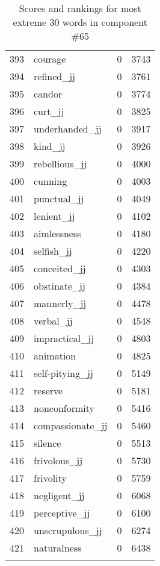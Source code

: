 \begin{longtable}[!htbp]{| rlr@{.}l |}
    393 & courage & 0 & 3743 \\
    394 & refined\_jj & 0 & 3761 \\
    395 & candor & 0 & 3774 \\
    396 & curt\_jj & 0 & 3825 \\
    397 & underhanded\_jj & 0 & 3917 \\
    398 & kind\_jj & 0 & 3926 \\
    399 & rebellious\_jj & 0 & 4000 \\
    400 & cunning & 0 & 4003 \\
    401 & punctual\_jj & 0 & 4049 \\
    402 & lenient\_jj & 0 & 4102 \\
    403 & aimlessness & 0 & 4180 \\
    404 & selfish\_jj & 0 & 4220 \\
    405 & conceited\_jj & 0 & 4303 \\
    406 & obstinate\_jj & 0 & 4384 \\
    407 & mannerly\_jj & 0 & 4478 \\
    408 & verbal\_jj & 0 & 4548 \\
    409 & impractical\_jj & 0 & 4803 \\
    410 & animation & 0 & 4825 \\
    411 & self-pitying\_jj & 0 & 5149 \\
    412 & reserve & 0 & 5181 \\
    413 & nonconformity & 0 & 5416 \\
    414 & compassionate\_jj & 0 & 5460 \\
    415 & silence & 0 & 5513 \\
    416 & frivolous\_jj & 0 & 5730 \\
    417 & frivolity & 0 & 5759 \\
    418 & negligent\_jj & 0 & 6068 \\
    419 & perceptive\_jj & 0 & 6100 \\
    420 & unscrupulous\_jj & 0 & 6274 \\
    421 & naturalness & 0 & 6438 \\
    \hline
    \caption{Scores and rankings for most extreme 30 words in component \#65} \\
\end{longtable}
